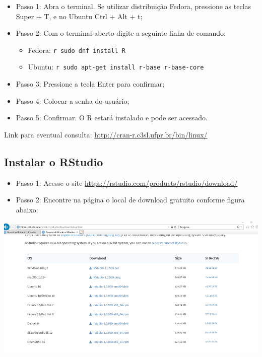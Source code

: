 \documentclass[
  brazil,
]{book}
\providecommand{\tightlist}{%
  \setlength{\itemsep}{0pt}\setlength{\parskip}{0pt}}
\begin{document}
\begin{itemize}
\tightlist
\item
  Passo 1: Abra o terminal. Se utilizar distribuição Fedora, pressione as teclas Super + T, e no Ubuntu Ctrl + Alt + t;\\
\item
  Passo 2: Com o terminal aberto digite a seguinte linha de comando:

  \begin{itemize}
  \tightlist
  \item
    Fedora: \texttt{r\ sudo\ dnf\ install\ R}
  \item
    Ubuntu: \texttt{r\ sudo\ apt-get\ install\ r-base\ r-base-core}\\
  \end{itemize}
\item
  Passo 3: Pressione a tecla Enter para confirmar;\\
\item
  Passo 4: Colocar a senha do usuário;\\
\item
  Passo 5: Confirmar. O R estará instalado e pode ser acessado.
\end{itemize}

Link para eventual consulta: \url{http://cran-r.c3sl.ufpr.br/bin/linux/}

\hypertarget{instalar-o-rstudio}{%
\subsection{Instalar o RStudio}\label{instalar-o-rstudio}}

\begin{itemize}
\tightlist
\item
  Passo 1: Acesse o site \url{https://rstudio.com/products/rstudio/download/}\\
\item
  Passo 2: Encontre na página o local de download gratuito conforme figura abaixo:
\end{itemize}

\includegraphics[width=13.54in]{img/inst_1_rstudio}
\end{document}
